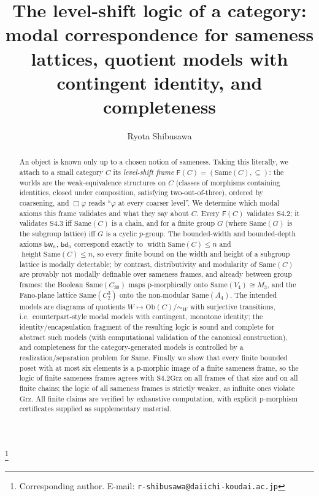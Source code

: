 \documentclass[11pt]{amsart}
\theoremstyle{definition}
\newcommand{\Same}{\mathrm{Same}}
\newcommand{\Ob}{\mathrm{Ob}}
\newcommand{\Fr}{\mathsf{F}}
\newcommand{\bw}{\mathsf{bw}}
\newcommand{\bd}{\mathsf{bd}}
\newcommand{\Grz}{\mathrm{Grz}}
\DeclareMathOperator{\wid}{width}
\DeclareMathOperator{\hgt}{height}
\begin{document}
\title[The level-shift logic of a category]{The level-shift logic of a
  category: modal correspondence for sameness lattices, quotient models with
  contingent identity, and completeness}
\author{Ryota Shibusawa}
\thanks{Corresponding author. E-mail: \texttt{r-shibusawa@daiichi-koudai.ac.jp}}
\address{Daiichi Institute of Technology}


\begin{abstract}
An object is known only up to a chosen notion of sameness. Taking this
literally, we attach to a small category $C$ its \emph{level-shift frame}
$\Fr(C)=(\Same(C),\subseteq)$: the worlds are the weak-equivalence structures on
$C$ (classes of morphisms containing identities, closed under composition,
satisfying two-out-of-three), ordered by coarsening, and $\Box\varphi$ reads
``$\varphi$ at every coarser level''. We determine which modal axioms this frame
validates and what they say about $C$. Every $\Fr(C)$ validates $\mathrm{S4.2}$;
it validates $\mathrm{S4.3}$ iff $\Same(C)$ is a chain, and for a finite group
$G$ (where $\Same(G)$ is the subgroup lattice) iff $G$ is a cyclic $p$-group. The
bounded-width and bounded-depth axioms $\bw_n$, $\bd_n$ correspond exactly to
$\wid\Same(C)\le n$ and $\hgt\Same(C)\le n$, so every finite bound on the width and
height of a subgroup lattice is modally detectable; by contrast, distributivity
and modularity of $\Same(C)$ are provably not modally definable over sameness
frames, and already between group frames: the Boolean $\Same(C_{30})$ maps
p-morphically onto $\Same(V_4)\cong M_3$, and the Fano-plane lattice
$\Same(C_2^3)$ onto the non-modular $\Same(A_4)$.
The intended models are diagrams of quotients $W\mapsto\Ob(C)/{\sim_W}$ with
surjective transitions, i.e.\ counterpart-style modal models with contingent,
monotone identity; the identity/encapsulation fragment of the resulting logic
is sound and complete for abstract such models (with computational validation
of the canonical construction), and completeness for the category-generated models
is controlled by a realization/separation problem for $\Same$. Finally we show that every finite
bounded poset with at most six elements is a p-morphic image of a finite
sameness frame, so the logic of finite sameness frames agrees with
$\mathrm{S4.2Grz}$ on all frames of that size and on all finite chains; the
logic of all sameness frames is strictly weaker, as infinite ones violate
$\Grz$. All finite claims are verified by exhaustive computation, with explicit
p-morphism certificates supplied as supplementary material.
\end{abstract}
\end{document}
